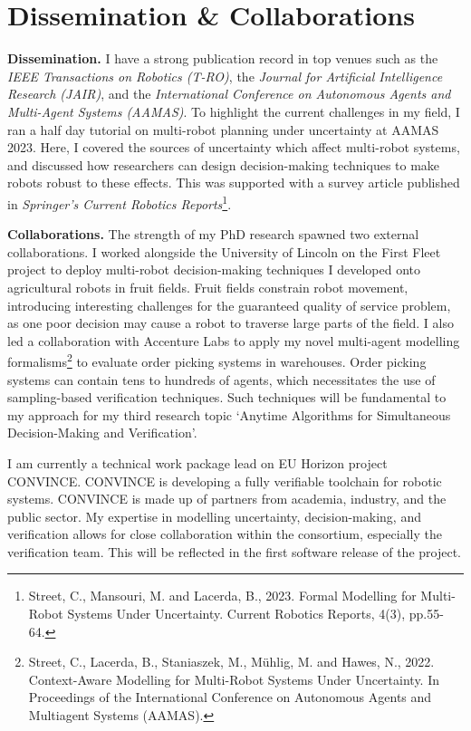 \documentclass[12pt]{article}
\begin{document}
\section*{Dissemination \& Collaborations}

\vspace*{1ex}\noindent\textbf{Dissemination.} I have a strong publication record in top venues such as the \emph{IEEE Transactions on Robotics (T-RO)}, the \emph{Journal for Artificial Intelligence Research (JAIR)}, and the \emph{International Conference on Autonomous Agents and Multi-Agent Systems (AAMAS)}.
%
To highlight the current challenges in my field, I ran a half day tutorial on multi-robot planning under uncertainty at AAMAS 2023.
%
Here, I covered the sources of uncertainty which affect multi-robot systems, and discussed how researchers can design decision-making techniques to make robots robust to these effects.
%
This was supported with a survey article published in \emph{Springer's Current Robotics Reports}\footnote{Street, C., Mansouri, M. and Lacerda, B., 2023. Formal Modelling for Multi-Robot Systems Under Uncertainty. Current Robotics Reports, 4(3), pp.55-64.}.

\vspace*{1ex}\noindent\textbf{Collaborations.} The strength of my PhD research spawned two external collaborations.
%
I worked alongside the University of Lincoln on the First Fleet project to deploy multi-robot decision-making techniques I developed onto agricultural robots in fruit fields.
%
Fruit fields constrain robot movement, introducing interesting challenges for the guaranteed quality of service problem, as one poor decision may cause a robot to traverse large parts of the field.
%
I also led a collaboration with Accenture Labs to apply my novel multi-agent modelling formalisms\footnote{Street, C., Lacerda, B., Staniaszek, M., Mühlig, M. and Hawes, N., 2022. Context-Aware Modelling for Multi-Robot Systems Under Uncertainty. In Proceedings of the International Conference on Autonomous Agents
and Multiagent Systems (AAMAS).} to evaluate order picking systems in warehouses.
%
Order picking systems can contain tens to hundreds of agents, which necessitates the use of sampling-based verification techniques.
%
Such techniques will be fundamental to my approach for my third research topic `Anytime Algorithms for Simultaneous Decision-Making and Verification'.


I am currently a technical work package lead on EU Horizon project CONVINCE.
%
CONVINCE is developing a fully verifiable toolchain for robotic systems.
%
CONVINCE is made up of partners from academia, industry, and the public sector.
%
My expertise in modelling uncertainty, decision-making, and verification allows for close collaboration within the consortium, especially the verification team.
%
This will be reflected in the first software release of the project.
\end{document}
